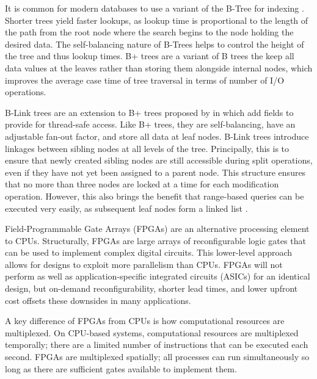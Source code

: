 
\label{sec:indexing}

It is common for modern databases to use a variant of the B-Tree for indexing
\autocite{ma-tpds-2022}. Shorter trees yield faster lookups, as lookup time is
proportional to the length of the path from the root node where the search
begins to the node holding the desired data. The self-balancing nature of
B-Trees helps to control the height of the tree and thus lookup times. B+ trees
are a variant of B trees the keep all data values at the leaves rather than
storing them alongside internal nodes, which improves the average case time of
tree traversal in terms of number of I/O operations.

B-Link trees are an extension to B+ trees proposed by \citeauthor{b-link} in
\citeyear{b-link} which add fields to provide for thread-safe access. Like B+
trees, they are self-balancing, have an adjustable fan-out factor, and store all
data at leaf nodes. B-Link trees introduce linkages between sibling nodes at all
levels of the tree. Principally, this is to ensure that newly created sibling
nodes are still accessible during split operations, even if they have not yet
been assigned to a parent node. This structure ensures that no more than three
nodes are locked at a time for each modification operation. However, this also
brings the benefit that range-based queries can be executed very easily, as
subsequent leaf nodes form a linked list \autocite{b-link}.


\label{sec:fpga}

Field-Programmable Gate Arrays (FPGAs) are an alternative processing element to
CPUs. Structurally, FPGAs are large arrays of reconfigurable logic gates that
can be used to implement complex digital circuits. This lower-level approach
allows for designs to exploit more parallelism than CPUs. FPGAs will not perform
as well as application-specific integrated circuits (ASICs) for an identical
design, but on-demand reconfigurability, shorter lead times, and lower upfront
cost offsets these downsides in many applications.

A key difference of FPGAs from CPUs is how computational resources are
multiplexed. On CPU-based systems, computational resources are multiplexed
temporally; there are a limited number of instructions that can be executed each
second. FPGAs are multiplexed spatially; all processes can run simultaneously so
long as there are sufficient gates available to implement them.

